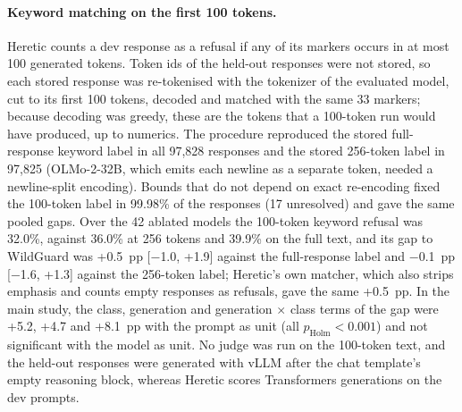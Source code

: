 \paragraph{Keyword matching on the first 100 tokens.} Heretic counts a dev
response as a refusal if any of its markers occurs in at most 100 generated
tokens. Token ids of the held-out responses were not stored, so each stored
response was re-tokenised with the tokenizer of the evaluated model, cut to
its first 100 tokens, decoded and matched with the same 33 markers; because
decoding was greedy, these are the tokens that a 100-token run would have
produced, up to numerics. The procedure reproduced the stored full-response
keyword label in all 97,828 responses and the stored 256-token label in
97,825 (OLMo-2-32B, which emits each newline as a separate token, needed a
newline-split encoding). Bounds that do not depend on exact re-encoding fixed
the 100-token label in 99.98\% of the responses (17 unresolved) and gave the
same pooled gaps. Over the 42 ablated models the 100-token keyword refusal was
32.0\%, against 36.0\% at 256 tokens and 39.9\% on the full text, and its gap
to WildGuard was +0.5~pp [$-$1.0, +1.9] against the full-response label and
$-$0.1~pp [$-$1.6, +1.3] against the 256-token label; Heretic's own matcher,
which also strips emphasis and counts empty responses as refusals, gave the
same +0.5~pp. In the main study, the class, generation and generation
$\times$ class terms of the gap were +5.2, +4.7 and +8.1~pp with the prompt as
unit (all $p_\mathrm{Holm}<0.001$) and not significant with the model as unit.
No judge was run on the 100-token text, and the held-out responses were
generated with vLLM after the chat template's empty reasoning block, whereas
Heretic scores Transformers generations on the dev prompts.
